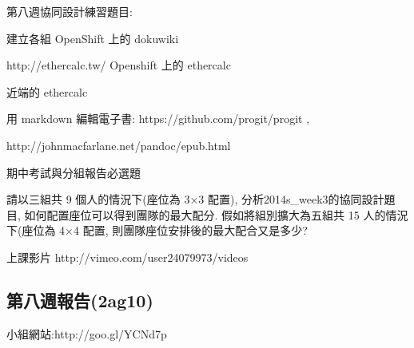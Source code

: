 \documentclass[]{article}
\begin{document}
第八週協同設計練習題目:

建立各組 OpenShift 上的 dokuwiki

http://ethercalc.tw/ Openshift 上的 ethercalc

近端的 ethercalc

用 markdown 編輯電子書: https://github.com/progit/progit ,

http://johnmacfarlane.net/pandoc/epub.html

期中考試與分組報告必選題

請以三組共 9 個人的情況下(座位為 3×3 配置),
分析2014s\_week3的協同設計題目, 如何配置座位可以得到團隊的最大配分.
假如將組別擴大為五組共 15 人的情況下(座位為 4×4 配置,
則團隊座位安排後的最大配合又是多少?

上課影片 http://vimeo.com/user24079973/videos

\subsection{第八週報告(2ag10)}\label{ux7b2cux516bux9031ux5831ux544a2ag10}

小組網站:http://goo.gl/YCNd7p
\end{document}
